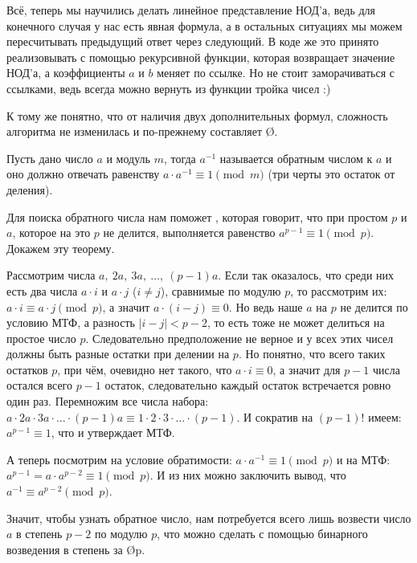 Всё, теперь мы научились делать линейное представление НОД'а, ведь для конечного случая у нас есть явная формула, а в остальных ситуациях мы можем пересчитывать предыдущий ответ через следующий. В коде же это принято реализовывать с помощью рекурсивной функции, которая возвращает значение НОД'а, а коэффициенты $a$ и $b$ меняет по ссылке. Но не стоит заморачиваться с ссылками, ведь всегда можно вернуть из функции тройка чисел :)

К тому же понятно, что от наличия двух дополнительных формул, сложность алгоритма не изменилась и по-прежнему составляет \O{\log{}}.


Пусть дано число $a$ и модуль $m$, тогда $a^{-1}$ называется обратным числом к $a$ и оно должно отвечать равенству $a \cdot a^{-1} \equiv 1{\pmod {m}}$ (три черты это остаток от деления).

Для поиска обратного числа нам поможет , которая говорит, что при простом $p$ и $a$, которое на это $p$ не делится, выполняется равенство $a^{p - 1} \equiv 1{\pmod{p}}$. Докажем эту теорему.

Рассмотрим числа $a,\ 2a,\ 3a,\ \ldots,\ (p - 1)a$. Если так оказалось, что среди них есть два числа $a \cdot i$ и $a \cdot j$ ($i \ne j$), сравнимые по модулю $p$, то рассмотрим их: $a \cdot i \equiv a \cdot j {\pmod{p}}$, а значит $a \cdot (i - j) \equiv 0$. Но ведь наше $a$ на $p$ не делится по условию МТФ, а разность $|i - j| < p - 2$, то есть тоже не может делиться на простое число $p$. Следовательно предположение не верное и у всех этих чисел должны быть разные остатки при делении на $p$. Но понятно, что всего таких остатков $p$, при чём, очевидно нет такого, что $a \cdot i \equiv 0$, а значит для $p - 1$ числа остался всего $p - 1$ остаток, следовательно каждый остаток встречается ровно один раз. Перемножим все числа набора: $a \cdot 2a \cdot 3a \cdot \ldots \cdot (p - 1)a \equiv 1 \cdot 2 \cdot 3 \cdot \ldots \cdot (p - 1)$. И сократив на $(p - 1)!$ имеем: $a^{p - 1} \equiv 1$, что и утверждает МТФ.

А теперь посмотрим на условие обратимости: $a \cdot a^{-1} \equiv 1 {\pmod{p}}$ и на МТФ: $a^{p - 1} = a \cdot a^{p - 2} \equiv 1 {\pmod{p}}$. И из них можно заключить вывод, что $a^{-1} \equiv a^{p - 2} {\pmod{p}}$.

Значит, чтобы узнать обратное число, нам потребуется всего лишь возвести число $a$ в степень $p - 2$ по модулю $p$, что можно сделать с помощью бинарного возведения в степень за \O{\log p}.
